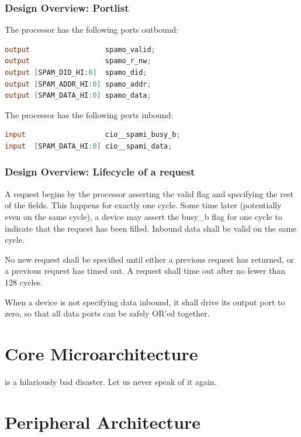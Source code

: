 \documentclass[10pt,twocolumn]{article}
\begin{document}
\subsubsection{Design Overview: Portlist}

The processor has the following ports outbound:

\begin{lstlisting}[basicstyle=\footnotesize,language=Verilog]
output                  spamo_valid;
output                  spamo_r_nw;
output [SPAM_DID_HI:0]  spamo_did;
output [SPAM_ADDR_HI:0] spamo_addr;
output [SPAM_DATA_HI:0] spamo_data;
\end{lstlisting}

The processor has the following ports inbound:

\begin{lstlisting}[basicstyle=\footnotesize,language=Verilog]
input                   cio__spami_busy_b;
input  [SPAM_DATA_HI:0] cio__spami_data;
\end{lstlisting}

\subsubsection{Design Overview: Lifecycle of a request}

A request begins by the processor asserting the valid flag and specifying
the rest of the fields. This happens for exactly one cycle. Some time later
(potentially even on the same cycle), a device may assert the busy\_b flag
for one cycle to indicate that the request has been filled. Inbound data
shall be valid on the same cycle.

No new request shall be specified until either a previous request has
returned, or a previous request has timed out. A request shall time out
after no fewer than 128 cycles.

When a device is not specifying data inbound, it shall drive its output port
to zero, so that all data ports can be safely OR'ed together.

\section{Core Microarchitecture}

is a hilariously bad disaster.  Let us never speak of it again.

\section{Peripheral Architecture}
\end{document}
